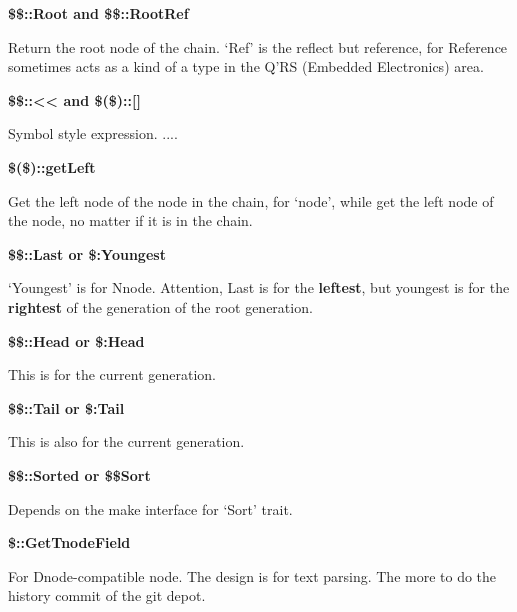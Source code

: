 \textbf{\$\$::Root and \$\$::RootRef}

Return the root node of the chain. `Ref' is the reflect but reference, for Reference sometimes acts as a kind of a type in the Q'RS (Embedded Electronics) area.

\textbf{\$\$::\textless{}\textless{} and \$(\$)::[]}

Symbol style expression. ....

\textbf{\$(\$)::getLeft}

Get the left node of the node in the chain, for `node', while get the left node of the node, no matter if it is in the chain.

\textbf{\$\$::Last or \$:Youngest}

`Youngest' is for Nnode. Attention, Last is for the \textbf{leftest}, but youngest is for the \textbf{rightest} of the generation of the root generation.

\textbf{\$\$::Head or \$:Head}

This is for the current generation.

\textbf{\$\$::Tail or \$:Tail}

This is also for the current generation.

\textbf{\$\$::Sorted or \$\$Sort}

Depends on the make interface for `Sort' trait.

\textbf{\$::GetTnodeField}

For Dnode-compatible node. The design is for text parsing. The more to do the history commit of the git depot.

